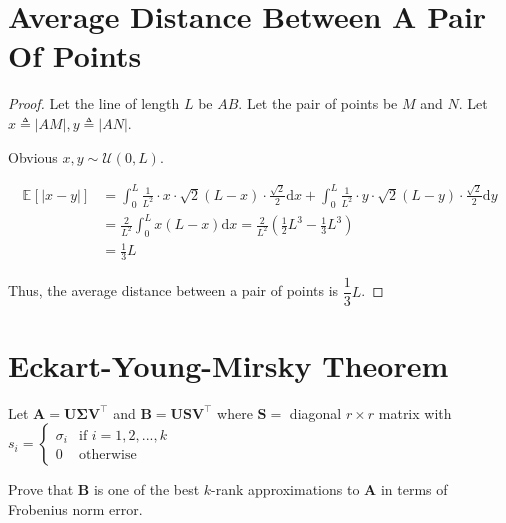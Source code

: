 \documentclass{article}
\newcommand{\staExp}[2]{\mathbb{E}_{#1}\left[#2\right]}
\newcommand{\bd}[1]{\boldsymbol{#1}}
\begin{document}
\vspace{3em}
\section{Average Distance Between A Pair Of Points}
\vspace{1em}
\begin{proof}
    Let the line of length $L$ be $AB$. Let the pair of points be $M$ and $N$. Let $x\triangleq|AM|, y\triangleq|AN|$.

    \hspace{1.3em}
    Obvious $x,y\sim \mathcal{U}(0,L)$.

    \vspace{-2em} \hspace{1.3em}
    \begin{align*}
        \staExp{}{|x-y|} &= \int_0^L \frac{1}{L^2}\cdot x\cdot\sqrt{2}(L-x)\cdot\frac{\sqrt{2}}{2}\mathrm{d}x + \int_0^L \frac{1}{L^2}\cdot y\cdot\sqrt{2}(L-y)\cdot\frac{\sqrt{2}}{2}\mathrm{d}y \\
        &= \frac{2}{L^2} \int_0^L x(L-x) \mathrm{d}x = \frac{2}{L^2} \left(\frac{1}{2}L^3-\frac{1}{3}L^3\right) \\
        &= \frac{1}{3}L
    \end{align*}

    \vspace{-0.5em} \hspace{1.3em}
    Thus, the average distance between a pair of points is $\dfrac{1}{3}L$.
\end{proof}

\vspace{1em}
\section{Eckart-Young-Mirsky Theorem}

Let $\bd{A} = \bd{U}\bd{\Sigma}\bd{V}^\top$ and $\bd{B} = \bd{U} \bd{S} \bd{V}^\top$ where $\bd{S} = $ diagonal $r \times r$ matrix with $s_i=\left\{
    \begin{array}{ll}
        \sigma_i & \text{if } i=1,2,...,k\\
        0 & \text{otherwise}
    \end{array}
    \right.$

\vspace{0.5em} \hspace{-1.8em}
Prove that $\bd{B}$ is one of the best $k$-rank approximations to $\bd{A}$ in terms of Frobenius norm error.
\end{document}
